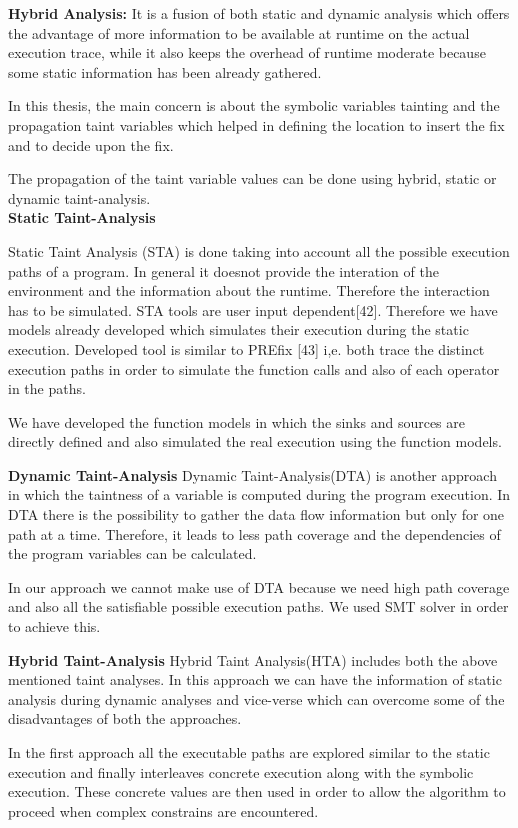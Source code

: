 \textbf{Hybrid Analysis:}
It is a fusion of both static and dynamic analysis which offers the advantage
of more information to be available at runtime on the actual execution trace,
while it also keeps the overhead of runtime moderate because some
static information has been already gathered.


In this thesis, the main concern is about the symbolic variables tainting
and the propagation taint variables which helped in defining the location
to insert the fix and to decide upon the fix.

The propagation of the taint variable values can be done using hybrid,
static or dynamic taint-analysis.\\

\textbf{Static Taint-Analysis}

Static Taint Analysis (STA) is done taking into account all the possible execution
paths of a program. In general it doesnot provide the interation of the environment and the information
about the runtime. Therefore the interaction has to be simulated. STA tools are user input dependent[42]. 
Therefore we have models already developed which simulates their execution
during the static execution. Developed tool is similar to PREfix [43] i,e. both trace the distinct execution paths in order
to simulate the function calls and also of each operator in the paths.

We have developed the function models in which the sinks and sources are directly
defined and also simulated the real execution using the function models. 

\textbf{Dynamic Taint-Analysis}
Dynamic Taint-Analysis(DTA) is another approach in which the taintness of a variable
is computed during the program execution. In DTA there is the possibility to 
gather the data flow information but only for one path at a time. Therefore,
it leads to less path coverage and the dependencies of the program
variables can be calculated.


In our approach we cannot make use of DTA because we need
high path coverage and also all the satisfiable possible execution
paths. We used SMT solver in order to achieve this.


\textbf{Hybrid Taint-Analysis}
Hybrid Taint Analysis(HTA) includes both the above mentioned taint analyses.
In this approach we can have the information of static analysis during 
dynamic analyses and vice-verse which can overcome some of the disadvantages
of both the approaches.

In the first approach all the executable paths are explored similar to the static
execution and finally interleaves concrete execution along with the symbolic 
execution. These concrete values are then used in order to allow the algorithm
to proceed when complex constrains are encountered.

